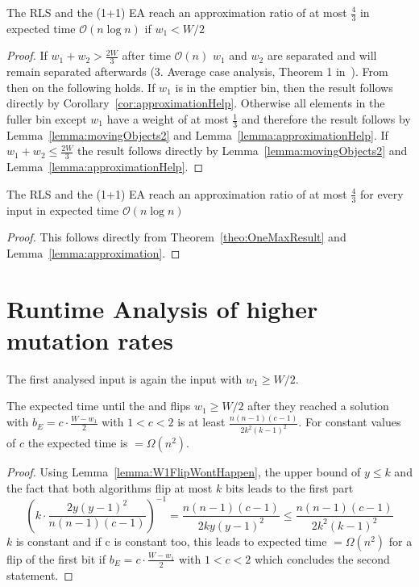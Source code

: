 \begin{lemma}\label{lemma:approximation}
    The RLS and the (1+1) EA reach an approximation ratio of at most $\frac{4}{3}$ in expected time $\mathcal{O}(n\log{}n)$ if $w_1 < W/2$
\end{lemma}
\begin{proof}
    If \(w_1+w_2 > \frac{2W}{3}\) after time $\mathcal{O}(n)$ $w_1$ and $w_2$ are separated and will remain separated afterwards (3. Average case analysis, Theorem 1 in~\cite{witt2005worst}).
    From then on the following holds.
    If $w_1$ is in the emptier bin, then the result follows directly by Corollary~\ref{cor:approximationHelp}.
    Otherwise all elements in the fuller bin except $w_1$ have a weight of at most $\frac{1}{3}$ and therefore the result follows by Lemma~\ref{lemma:movingObjects2} and Lemma~\ref{lemma:approximationHelp}.
    If \(w_1+w_2 \le \frac{2W}{3}\) the result follows directly by Lemma~\ref{lemma:movingObjects2} and Lemma~\ref{lemma:approximationHelp}.
\end{proof}

\begin{corollary}
    The RLS and the (1+1) EA reach an approximation ratio of at most $\frac{4}{3}$ for every input in expected time $\mathcal{O}(n\log{}n)$
\end{corollary}
\begin{proof}
    This follows directly from Theorem~\ref{theo:OneMaxResult} and Lemma~\ref{lemma:approximation}.
\end{proof}


\section{Runtime Analysis of higher mutation rates}

The first analysed input is again the input with $w_1\ge W/2$.

\begin{corollary}\label{corollary:W1FlipWontHappen}
    The expected time until the \RLSR[k] and \RLSN[k] flips $w_1\ge W/2$ after they reached a solution with $b_E = c\cdot\frac{W-w_1}{2}$ with $1<c<2$ is at least \(\frac{n(n-1)(c-1)}{2k^2{(k-1)}^2}\). For constant values of $c$ the expected time is $=\Omega(n^2)$.
\end{corollary}
\begin{proof}
    Using Lemma~\ref{lemma:W1FlipWontHappen}, the upper bound of $y\le k$ and the fact that both algorithms flip at most $k$ bits leads to the first part
    \[ {(k\cdot\frac{2y{(y-1)}^2}{n(n-1)(c-1)})}^{-1}=\frac{n(n-1)(c-1)}{2ky{(y-1)}^2} \le\frac{n(n-1)(c-1)}{2k^2{(k-1)}^2}\]
    $k$ is constant and if c is constant too, this leads to expected time $=\Omega(n^2)$ for a flip of the first bit if $b_E = c\cdot\frac{W-w_1}{2}$ with $1<c<2$ which concludes the second statement.
\end{proof}

